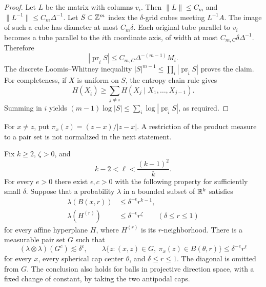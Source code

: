 \begin{proof}
Let $L$ be the matrix with columns $v_i$. Then $\|L\|\le C_m$ and
$\|L^{-1}\|\le C_m\Delta^{-1}$. Let $S\subset\mathbb Z^m$ index the
$\delta$-grid cubes meeting $L^{-1}A$. The image of such a cube has
diameter at most $C_m\delta$. Each original tube parallel to $v_i$
becomes a tube parallel to the $i$th coordinate axis, of width at most
$C_{m,C}\delta\Delta^{-1}$. Therefore
\[
 |\operatorname{pr}_{\widehat i}S|
       \le C_{m,C}\Delta^{-(m-1)}M_i.
\]
The discrete Loomis--Whitney inequality \cite{LoomisWhitney1949}
$|S|^{m-1}\le\prod_i|\operatorname{pr}_{\widehat i}S|$ proves the
claim. For completeness, if $X$ is uniform on $S$, the entropy chain rule
gives
\[
 H(X_{\widehat i})\ge
 \sum_{j\ne i}H(X_j\mid X_1,\ldots,X_{j-1}).
\]
Summing in $i$ yields $(m-1)\log|S|\le
\sum_i\log|\operatorname{pr}_{\widehat i}S|$, as required.
\end{proof}

For $x\ne z$, put $\pi_x(z)=(z-x)/|z-x|$. A restriction of the
product measure to a pair set is not normalized in the next statement.

\begin{lemma}\label{ang:weak-radial}
Fix $k\ge2$, $\zeta>0$, and
\[
 k-2<\ell<\frac{(k-1)^2}{k}.
\]
For every $e>0$ there exist $\epsilon,c>0$ with the following property
for sufficiently small $\delta$. Suppose that a probability $\lambda$
in a bounded subset of $\mathbb R^k$ satisfies
\begin{align*}
 \lambda(B(x,r))&\le\delta^{-\epsilon}r^{k-1},\\
 \lambda(H^{(r)})&\le\delta^{-\epsilon}r^\zeta
 \qquad(\delta\le r\le1)
\end{align*}
for every affine hyperplane $H$, where $H^{(r)}$ is its $r$-neighborhood.
There is a measurable pair set $G$ such that
\[
 (\lambda\otimes\lambda)(G^c)\lesssim\delta^c,
 \qquad
 \lambda\{z:(x,z)\in G,\ \pi_x(z)\in B(\theta,r)\}
       \le\delta^{-e}r^\ell
\]
for every $x$, every spherical cap center $\theta$, and
$\delta\le r\le1$. The diagonal is omitted from $G$. The conclusion
also holds for balls in projective direction space, with a fixed change
of constant, by taking the two antipodal caps.
\end{lemma}

